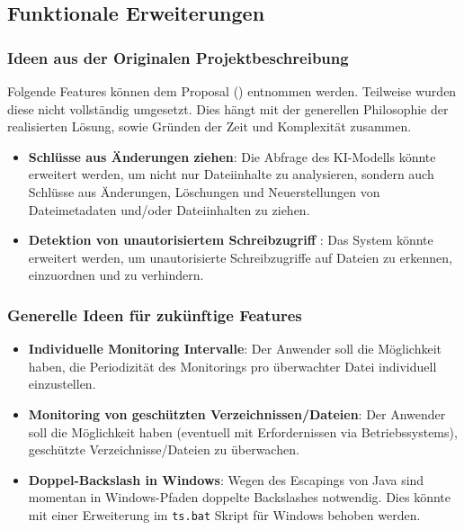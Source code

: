 \documentclass[a4paper,12pt]{report}
\begin{document}
    \subsection{Funktionale Erweiterungen}\label{subsec:funktionale-erweiterungen}

    \subsubsection{Ideen aus der Originalen Projektbeschreibung}
    Folgende Features können dem Proposal () entnommen werden.
    Teilweise wurden diese nicht vollständig umgesetzt.
    Dies hängt mit der generellen Philosophie der realisierten Lösung, sowie Gründen der Zeit und Komplexität zusammen.
    \begin{itemize}
        \item \textbf{Schlüsse aus Änderungen ziehen\footnotemark[1]}: Die Abfrage des KI-Modells könnte erweitert werden, um nicht nur Dateiinhalte zu analysieren, sondern auch Schlüsse aus Änderungen, Löschungen und Neuerstellungen von Dateimetadaten und/oder Dateiinhalten zu ziehen.
        \item \textbf{Detektion von unautorisiertem Schreibzugriff \footnotemark[1]}: Das System könnte erweitert werden, um unautorisierte Schreibzugriffe auf Dateien zu erkennen, einzuordnen und zu verhindern.
    \end{itemize}

    \subsubsection{Generelle Ideen für zukünftige Features}
    \begin{itemize}
        \item \textbf{Individuelle Monitoring Intervalle}: Der Anwender soll die Möglichkeit haben, die Periodizität des Monitorings pro überwachter Datei individuell einzustellen.
        \item \textbf{Monitoring von geschützten Verzeichnissen/Dateien}: Der Anwender soll die Möglichkeit haben (eventuell mit Erfordernissen via Betriebssystems), geschützte Verzeichnisse/Dateien zu überwachen.
        \item \textbf{Doppel-Backslash in Windows}: Wegen des Escapings von Java sind momentan in Windows-Pfaden doppelte Backslashes notwendig.
        Dies könnte mit einer Erweiterung im \texttt{ts.bat} Skript für Windows behoben werden.
    \end{itemize}
\end{document}
